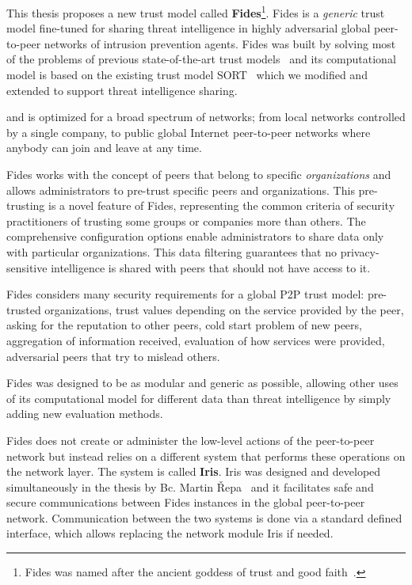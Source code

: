This thesis proposes a new trust model called \textbf{Fides}\footnote{Fides was named after the ancient goddess of trust and good faith~\cite{enwiki:1086924565}.}.
Fides is a \textit{generic} trust model fine-tuned for sharing threat intelligence in highly adversarial global peer-to-peer networks of intrusion prevention agents.
Fides was built by solving most of the problems of previous state-of-the-art trust models~\cite{sort, dita} and its computational model is based on the existing trust model SORT~\cite{sort} which we modified and extended to support threat intelligence sharing.

and is optimized for a broad spectrum of networks; from local networks controlled by a single company, to public global Internet peer-to-peer networks where anybody can join and leave at any time.

Fides works with the concept of peers that belong to specific \textit{organizations} and allows administrators to pre-trust specific peers and organizations. This pre-trusting is a novel feature of Fides, representing the common criteria of security practitioners of trusting some groups or companies more than others. The comprehensive configuration options enable administrators to share data only with particular organizations. This data filtering guarantees that no privacy-sensitive intelligence is shared with peers that should not have access to it.

Fides considers many security requirements for a global P2P trust model: pre-trusted organizations, trust values depending on the service provided by the peer, asking for the reputation to other peers, cold start problem of new peers, aggregation of information received, evaluation of how services were provided, adversarial peers that try to mislead others.

Fides was designed to be as modular and generic as possible, allowing other uses of its computational model for different data than threat intelligence by simply adding new evaluation methods.

Fides does not create or administer the low-level actions of the peer-to-peer network but instead relies on a different system that performs these operations on the network layer. The system is called \textbf{Iris}. Iris was designed and developed simultaneously in the thesis by Bc. Martin Řepa~\cite{nl} and it facilitates safe and secure communications between Fides instances in the global peer-to-peer network. Communication between the two systems is done via a standard defined interface, which allows replacing the network module Iris if needed.

